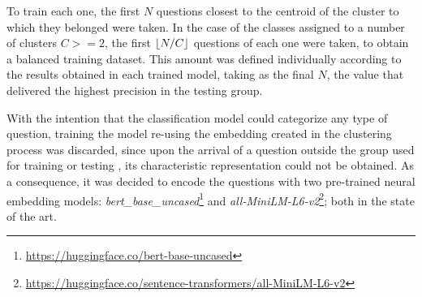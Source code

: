 To train each one, the first $N$ questions closest to the centroid of the cluster to which they belonged were taken. In the case of the classes assigned to a number of clusters $C >= 2$, the first $\lfloor N / C \rfloor$ questions of each one were taken, to obtain a balanced training dataset. This amount was defined individually according to the results obtained in each trained model, taking as the final $N$, the value that delivered the highest precision in the testing group.

With the intention that the classification model could categorize any type of question, training the model re-using the embedding created in the clustering process was discarded, since upon the arrival of a question outside the group used for training or testing , its characteristic representation could not be obtained.
As a consequence, it was decided to encode the questions with two pre-trained neural embedding models: \emph{bert\_base\_uncased}\footnote{\url{https://huggingface.co/bert-base-uncased}} and \emph{all-MiniLM-L6-v2}\footnote {\url{https://huggingface.co/sentence-transformers/all-MiniLM-L6-v2}}; both in the state of the art.

